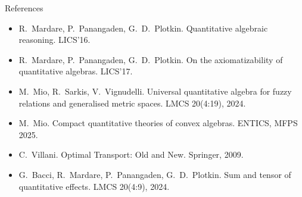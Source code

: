 \documentclass[10pt,aspectratio=169]{beamer}
\begin{document}
                \appendix

                \begin{frame}{References}
                    \small
                    \begin{itemize}
                        \item R.~Mardare, P.~Panangaden, G.~D.~Plotkin.
                            Quantitative algebraic reasoning. LICS'16.
                        \item R.~Mardare, P.~Panangaden, G.~D.~Plotkin.
                            On the axiomatizability of
                            quantitative algebras. LICS'17.
                        \item M.~Mio, R.~Sarkis, V.~Vignudelli.
                            Universal quantitative algebra for
                            fuzzy relations and
                            generalised metric spaces. LMCS 20(4:19), 2024.
                        \item M.~Mio. Compact quantitative
                            theories of convex algebras.
                            ENTICS, MFPS 2025.
                        \item C.~Villani. Optimal Transport: Old
                            and New. Springer, 2009.
                        \item G.~Bacci, R.~Mardare,
                            P.~Panangaden, G.~D.~Plotkin.
                            Sum and tensor of quantitative
                            effects. LMCS 20(4:9), 2024.
                    \end{itemize}
                \end{frame}

                
\end{document}
